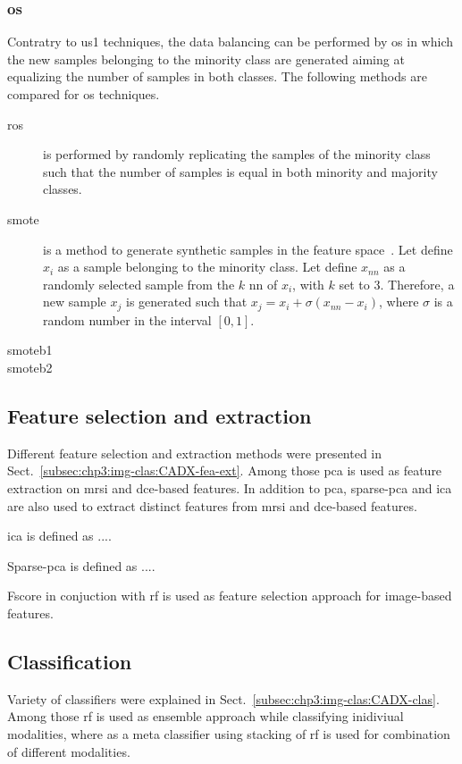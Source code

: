 \subsubsection{\Acl*{os}}
Contratry to \ac{us1} techniques, the data balancing can be performed by \ac{os} in which the new samples belonging to the minority class are generated aiming at equalizing the number of samples in both classes.
The following methods are compared for \ac{os} techniques.
\begin{description}
\item[\Ac{ros}] is performed by randomly replicating the samples of the minority class such that the number of samples is equal in both minority and majority classes.
\item[\Ac{smote}] is a method to generate synthetic samples in the feature space~\cite{chawla2002smote}.
Let define $x_i$ as a sample belonging to the minority class.
Let define $x_{nn}$ as a randomly selected sample from the $k$ \ac{nn} of $x_i$, with $k$ set to 3.
Therefore, a new sample $x_j$ is generated such that $x_j = x_i + \sigma \left( x_{nn} - x_i \right)$, where $\sigma$ is a random number in the interval $\left[0,1\right]$.
\item[\Ac{smoteb1}]
\item[\Ac{smoteb2}]
\end{description}

\subsection{Feature selection and extraction}\label{subsec:chp6:method:fea-sel}
Different feature selection and extraction methods were presented in Sect.~\ref{subsec:chp3:img-clas:CADX-fea-ext}.
Among those \ac{pca} is used as feature extraction on  \ac{mrsi} and \ac{dce}-based features.
In addition to \ac{pca}, sparse-\ac{pca} and \ac{ica} are also used to extract distinct features from \ac{mrsi} and \ac{dce}-based features.

\Ac{ica} is defined as ....

Sparse-\ac{pca} is defined as .... 

Fscore in conjuction with \ac{rf} is used as feature selection approach for image-based features.


\subsection{Classification}\label{subsec:chp6:method:clas}
Variety of classifiers were explained in Sect.~\ref{subsec:chp3:img-clas:CADX-clas}. 
Among those \ac{rf} is used as ensemble approach while classifying inidiviual modalities, where as a meta classifier using stacking of \ac{rf} is used for combination of different modalities.

